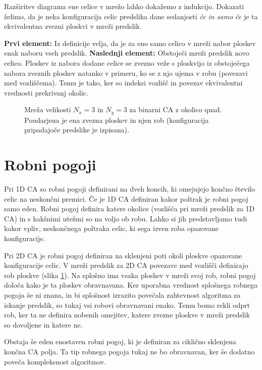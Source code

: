 \documentclass[12pt,a4paper,openany,twoside]{book}
\begin{document}
Razširitev diagrama ene celice v mrežo lahko dokažemo z indukcijo.
Dokazati želimo, da je neka konfiguracija celic predslika dane sedanjosti
\textit{če in samo če} je ta ekvivalentna zvezni ploskvi v mreži predslik.

\textbf{Prvi element:}
Iz definicije velja, da je za eno samo celico v mreži nabor ploskev enak naboru vseh predslik.
\textbf{Naslednji element:}
Obstoječi mreži predslik novo celico.
Ploskev iz nabora dodane celice se zvezno veže s ploskvijo
iz obstoječega nabora zveznih ploskev natanko v primeru,
ko se z njo ujema v robu (povezavi med vozliščema).
Temu je tako, ker so indeksi vozlišč in povezav ekvivalentni vrednosti prekrivanj okolic.

\begin{figure}[htb]
\centerline{}
\caption[Mreža polja celic.]{Mreža velikosti \(N_x=3\) in \(N_y=3\) za binarni CA z okolico quad.
Poudarjena je ena zvezna ploskev in njen rob (konfiguracija pripadajoče predslike je izpisana).}
\label{network_array}
\end{figure}

\section{Robni pogoji} 

Pri 1D CA so robni pogoji definirani na dveh koncih,
ki omejujejo končno število celic na neskončni premici.
Če je 1D CA definiran kakor poltrak je robni pogoj samo eden.
Robni pogoj definira katere okolice (vozlišča pri mreži predslik za 1D CA)
in s kakšnimi utežmi so na voljo ob robu.
Lahko si jih predstavljamo tudi kakor vpliv, neskončnega poltraka celic,
ki sega izven roba opazovane konfiguracije.

Pri 2D CA je robni pogoj definiran na sklenjeni poti okoli ploskve opazovane konfiguracije celic.
V mreži predslik za 2D CA povezave med vozlišči definirajo rob ploskve (slika \ref{network_array}).
Na splošno ima vsaka ploskev v mreži svoj rob, robni pogoj določa kako je ta ploskev obravnavana.
Ker uporabna vrednost splošnega robnega pogoja še ni znana,
in bi splošnost izrazito povečala zahtevnost algoritma za iskanje predslik,
so tukaj vsi robovi obravnavani enako. Temu bomo rekli odprt rob,
ker ta ne definira nobenih omejitev, katere zvezne ploskve v mreži predslik
so dovoljene in katere ne.

Obstaja še eden enostaven robni pogoj, ki je definiran za ciklično sklenjena končna CA polja.
Ta tip robnega pogoja tukaj ne bo obravnavan, ker še dodatno poveča kompleksnost algoritmov.
\end{document}
